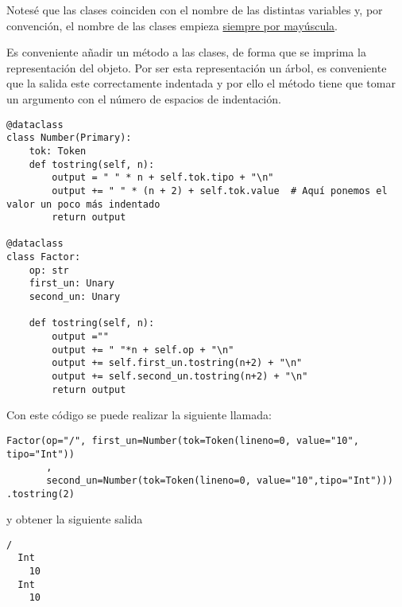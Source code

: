 Notesé que las clases coinciden con el nombre de las distintas variables y, por convención, el nombre de las clases empieza \href{https://peps.python.org/pep-0008/}{siempre por mayúscula}.
\label{sec:orga5152bc}

Es conveniente añadir un método a las clases, de forma que se imprima la representación del objeto. Por ser esta representación un árbol, es conveniente que la salida este correctamente indentada y por ello el método tiene que tomar un argumento con el número de espacios de indentación.

\begin{verbatim}
@dataclass
class Number(Primary):
    tok: Token
    def tostring(self, n):
        output = " " * n + self.tok.tipo + "\n"
        output += " " * (n + 2) + self.tok.value  # Aquí ponemos el valor un poco más indentado
        return output

@dataclass
class Factor:
    op: str
    first_un: Unary
    second_un: Unary

    def tostring(self, n):
        output =""
        output += " "*n + self.op + "\n"
        output += self.first_un.tostring(n+2) + "\n"
        output += self.second_un.tostring(n+2) + "\n"
        return output

\end{verbatim}

Con este código se puede realizar la siguiente llamada:
\begin{verbatim}
Factor(op="/", first_un=Number(tok=Token(lineno=0, value="10", tipo="Int"))
       ,
       second_un=Number(tok=Token(lineno=0, value="10",tipo="Int")))
.tostring(2)
\end{verbatim}

y obtener la siguiente salida

\begin{verbatim}
/
  Int
    10
  Int
    10
\end{verbatim}
\label{sec:orgb53d60c}

